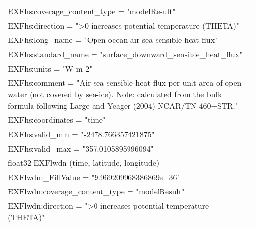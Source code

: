 \begin{longtable}{|p{\textwidth}|}
\hspace{0.5cm}\hspace{0.5cm}EXFhs:coverage\_content\_type = "modelResult"\\
\hspace{0.5cm}\hspace{0.5cm}EXFhs:direction = ">0 increases potential temperature (THETA)"\\
\hspace{0.5cm}\hspace{0.5cm}EXFhs:long\_name = "Open ocean air-sea sensible heat flux"\\
\hspace{0.5cm}\hspace{0.5cm}EXFhs:standard\_name = "surface\_downward\_sensible\_heat\_flux"\\
\hspace{0.5cm}\hspace{0.5cm}EXFhs:units = "W m-2"\\
\hspace{0.5cm}\hspace{0.5cm}EXFhs:comment = "Air-sea sensible heat flux per unit area of open water (not covered by sea-ice). Note: calculated from the bulk formula following Large and Yeager (2004) NCAR/TN-460+STR."\\
\hspace{0.5cm}\hspace{0.5cm}EXFhs:coordinates = "time"\\
\hspace{0.5cm}\hspace{0.5cm}EXFhs:valid\_min = "-2478.766357421875"\\
\hspace{0.5cm}\hspace{0.5cm}EXFhs:valid\_max = "357.0105895996094"\\
\hspace{0.5cm}float32 EXFlwdn (time, latitude, longitude)\\
\hspace{0.5cm}\hspace{0.5cm}EXFlwdn:\_FillValue = "9.969209968386869e+36"\\
\hspace{0.5cm}\hspace{0.5cm}EXFlwdn:coverage\_content\_type = "modelResult"\\
\hspace{0.5cm}\hspace{0.5cm}EXFlwdn:direction = ">0 increases potential temperature (THETA)"\\

\end{longtable}
